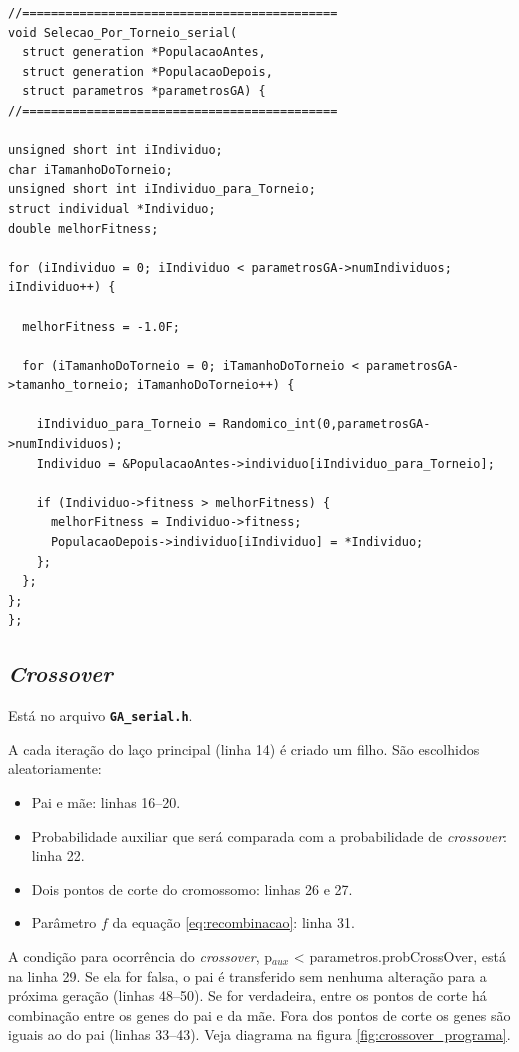 \vspace{1 cm}
\begin{lstlisting}
//============================================
void Selecao_Por_Torneio_serial(
  struct generation *PopulacaoAntes,
  struct generation *PopulacaoDepois,
  struct parametros *parametrosGA) {
//============================================

unsigned short int iIndividuo;
char iTamanhoDoTorneio;
unsigned short int iIndividuo_para_Torneio;
struct individual *Individuo;
double melhorFitness;

for (iIndividuo = 0; iIndividuo < parametrosGA->numIndividuos; iIndividuo++) {

  melhorFitness = -1.0F;

  for (iTamanhoDoTorneio = 0; iTamanhoDoTorneio < parametrosGA->tamanho_torneio; iTamanhoDoTorneio++) {

    iIndividuo_para_Torneio = Randomico_int(0,parametrosGA->numIndividuos);
    Individuo = &PopulacaoAntes->individuo[iIndividuo_para_Torneio];

    if (Individuo->fitness > melhorFitness) {
      melhorFitness = Individuo->fitness;
      PopulacaoDepois->individuo[iIndividuo] = *Individuo;
    };
  };
};
};
\end{lstlisting}
\vspace{1 cm}


\subsection{\emph{Crossover}}

	Está no arquivo \textbf{\texttt{GA\_serial.h}}.
	
	A cada iteração do laço principal (linha 14) é criado um filho. São escolhidos aleatoriamente:
	
	\begin{itemize}
		\item Pai e mãe: linhas 16--20.
		\item Probabilidade auxiliar que será comparada com a probabilidade de \emph{crossover}: linha 22.
		\item Dois pontos de corte do cromossomo: linhas 26 e 27.
		\item Parâmetro $f$ da equação \ref{eq:recombinacao}: linha 31.
	\end{itemize}
	
	A condição para ocorrência do \emph{crossover}, p$_{aux}$ < parametros.probCrossOver, está na linha 29. Se ela for falsa, o pai é transferido sem nenhuma alteração para a próxima geração (linhas 48--50). Se for verdadeira, entre os pontos de corte há combinação entre os genes do pai e da mãe. Fora dos pontos de corte os genes são iguais ao do pai (linhas 33--43). Veja diagrama na figura \ref{fig:crossover_programa}.
	
